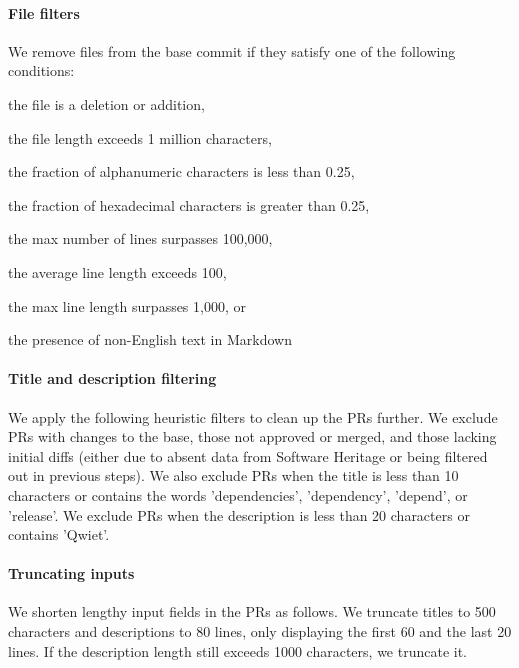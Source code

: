 \documentclass[10pt]{article} %
\begin{document}
\paragraph{File filters} We remove files from the base commit if they satisfy one of the following conditions: 
\begin{inparaenum}[1)]
    \item the file is a deletion or addition,
    \item the file length exceeds 1 million characters,
    \item the fraction of alphanumeric characters is less than 0.25,
    \item the fraction of hexadecimal characters is greater than 0.25,
    \item the max number of lines surpasses 100,000,
    \item the average line length exceeds 100,
    \item the max line length surpasses 1,000, or
    \item the presence of non-English text in Markdown
\end{inparaenum} 



\paragraph{Title and description filtering} We apply the following heuristic filters to clean up the PRs further. We exclude PRs with changes to the base, those not approved or merged, and those lacking initial diffs (either due to absent data from Software Heritage or being filtered out in previous steps). We also exclude PRs when the title is less than 10 characters or contains the words 'dependencies', 'dependency', 'depend', or 'release'. We exclude PRs when the description is less than 20 characters or contains 'Qwiet'.

\paragraph{Truncating inputs} We shorten lengthy input fields in the PRs as follows. We truncate titles to 500 characters and descriptions to 80 lines, only displaying the first 60 and the last 20 lines. If the description length still exceeds 1000 characters, we truncate it. 
\end{document}
